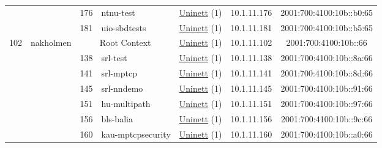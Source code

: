 \begin{small}
\begin{center}
\begin{longtable}{|c|c|c|c|c|c|c|c|}
  &  & \tiny{176} & \multicolumn{1}{|l|}{\tiny{ntnu-test}} & \multicolumn{2}{|c|}{\tiny{\href{https://www.uninett.no}{Uninett} (1)}} & \tiny{10.1.11.176} & \tiny{2001:700:4100:10b::b0:65} \\* \cline{3-3}\cline{4-4}\cline{5-5}\cline{6-6}\cline{7-7}\cline{8-8}
  &  & \tiny{181} & \multicolumn{1}{|l|}{\tiny{uio-sbdtests}} & \multicolumn{2}{|c|}{\tiny{\href{https://www.uninett.no}{Uninett} (1)}} & \tiny{10.1.11.181} & \tiny{2001:700:4100:10b::b5:65} \\ \hline
 \multirow{9}{*}{\tiny{102}} & \multicolumn{1}{|l|}{\multirow{9}{*}{\tiny{nakholmen}}} & \multicolumn{2}{|c|}{\tiny{Root Context}} & \multicolumn{2}{|c|}{\tiny{\href{https://www.uninett.no}{Uninett} (1)}} & \tiny{10.1.11.102} & \tiny{2001:700:4100:10b::66} \\* \cline{3-3}\cline{4-4}\cline{5-5}\cline{6-6}\cline{7-7}\cline{8-8}
  &  & \tiny{138} & \multicolumn{1}{|l|}{\tiny{srl-test}} & \multicolumn{2}{|c|}{\tiny{\href{https://www.uninett.no}{Uninett} (1)}} & \tiny{10.1.11.138} & \tiny{2001:700:4100:10b::8a:66} \\* \cline{3-3}\cline{4-4}\cline{5-5}\cline{6-6}\cline{7-7}\cline{8-8}
  &  & \tiny{141} & \multicolumn{1}{|l|}{\tiny{srl-mptcp}} & \multicolumn{2}{|c|}{\tiny{\href{https://www.uninett.no}{Uninett} (1)}} & \tiny{10.1.11.141} & \tiny{2001:700:4100:10b::8d:66} \\* \cline{3-3}\cline{4-4}\cline{5-5}\cline{6-6}\cline{7-7}\cline{8-8}
  &  & \tiny{145} & \multicolumn{1}{|l|}{\tiny{srl-nndemo}} & \multicolumn{2}{|c|}{\tiny{\href{https://www.uninett.no}{Uninett} (1)}} & \tiny{10.1.11.145} & \tiny{2001:700:4100:10b::91:66} \\* \cline{3-3}\cline{4-4}\cline{5-5}\cline{6-6}\cline{7-7}\cline{8-8}
  &  & \tiny{151} & \multicolumn{1}{|l|}{\tiny{hu-multipath}} & \multicolumn{2}{|c|}{\tiny{\href{https://www.uninett.no}{Uninett} (1)}} & \tiny{10.1.11.151} & \tiny{2001:700:4100:10b::97:66} \\* \cline{3-3}\cline{4-4}\cline{5-5}\cline{6-6}\cline{7-7}\cline{8-8}
  &  & \tiny{156} & \multicolumn{1}{|l|}{\tiny{bls-balia}} & \multicolumn{2}{|c|}{\tiny{\href{https://www.uninett.no}{Uninett} (1)}} & \tiny{10.1.11.156} & \tiny{2001:700:4100:10b::9c:66} \\* \cline{3-3}\cline{4-4}\cline{5-5}\cline{6-6}\cline{7-7}\cline{8-8}
  &  & \tiny{160} & \multicolumn{1}{|l|}{\tiny{kau-mptcpsecurity}} & \multicolumn{2}{|c|}{\tiny{\href{https://www.uninett.no}{Uninett} (1)}} & \tiny{10.1.11.160} & \tiny{2001:700:4100:10b::a0:66} \\* \cline{3-3}\cline{4-4}\cline{5-5}\cline{6-6}\cline{7-7}\cline{8-8}

\end{longtable}
\end{center}
\end{small}
